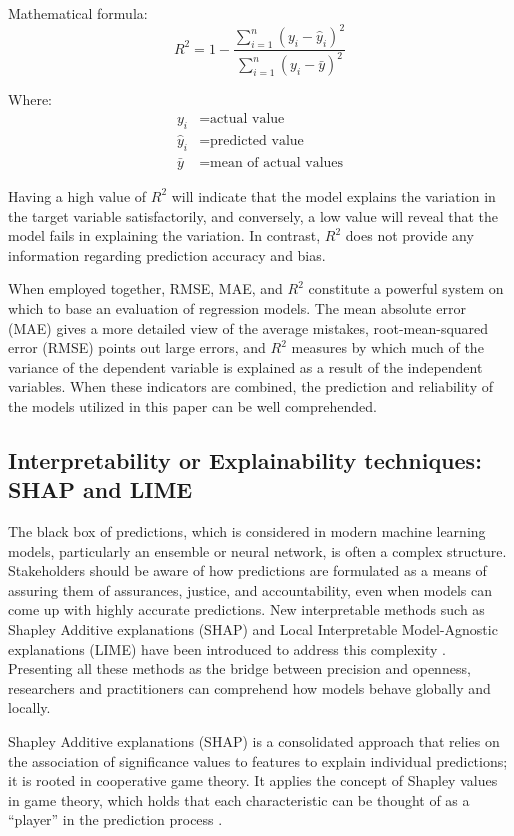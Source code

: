 \documentclass[12pt, a4paper, oneside]{book}
\begin{document}
Mathematical formula:
\[
R^2 = 1 - \frac{\sum_{i=1}^{n} (y_i - \hat{y}_i)^2}{\sum_{i=1}^{n} (y_i - \bar{y})^2}
\]

Where:
\begin{align*}
y_i &= \text{actual value} \\
\hat{y}_i &= \text{predicted value} \\
\bar{y} &= \text{mean of actual values}
\end{align*}

Having a high value of $R^2$ will indicate that the model explains the variation in the target variable satisfactorily, and conversely, a low value will reveal that the model fails in explaining the variation. In contrast, $R^2$ does not provide any information regarding prediction accuracy and bias.

When employed together, RMSE, MAE, and $R^2$ constitute a powerful system on which to base an evaluation of regression models. The mean absolute error (MAE) gives a more detailed view of the average mistakes, root-mean-squared error (RMSE) points out large errors, and $R^2$ measures by which much of the variance of the dependent variable is explained as a result of the independent variables. When these indicators are combined, the prediction and reliability of the models utilized in this paper can be well comprehended.

\subsection{Interpretability or Explainability techniques: SHAP and LIME }

The black box of predictions, which is considered in modern machine learning models, particularly an ensemble or neural network, is often a complex structure. Stakeholders should be aware of how predictions are formulated as a means of assuring them of assurances, justice, and accountability, even when models can come up with highly accurate predictions. New interpretable methods such as Shapley Additive explanations (SHAP) and Local Interpretable Model-Agnostic explanations (LIME) have been introduced to address this complexity \cite{fa2022}. Presenting all these methods as the bridge between precision and openness, researchers and practitioners can comprehend how models behave globally and locally.

Shapley Additive explanations (SHAP) is a consolidated approach that relies on the association of significance values to features to explain individual predictions; it is rooted in cooperative game theory. It applies the concept of Shapley values in game theory, which holds that each characteristic can be thought of as a ``player'' in the prediction process \cite{fa2022}.
\end{document}
